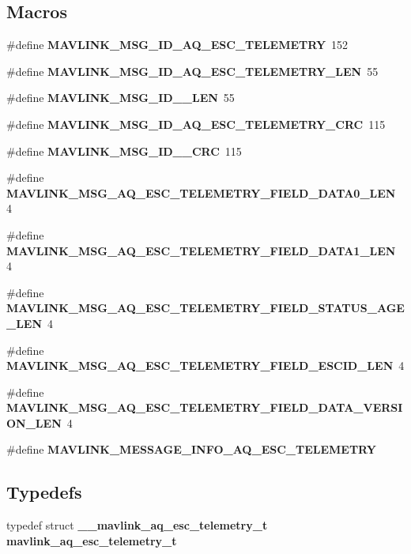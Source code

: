 \subsection*{Macros}
\begin{DoxyCompactItemize}
\item 
\#define \textbf{ M\+A\+V\+L\+I\+N\+K\+\_\+\+M\+S\+G\+\_\+\+I\+D\+\_\+\+A\+Q\+\_\+\+E\+S\+C\+\_\+\+T\+E\+L\+E\+M\+E\+T\+RY}~152
\item 
\#define \textbf{ M\+A\+V\+L\+I\+N\+K\+\_\+\+M\+S\+G\+\_\+\+I\+D\+\_\+\+A\+Q\+\_\+\+E\+S\+C\+\_\+\+T\+E\+L\+E\+M\+E\+T\+R\+Y\+\_\+\+L\+EN}~55
\item 
\#define \textbf{ M\+A\+V\+L\+I\+N\+K\+\_\+\+M\+S\+G\+\_\+\+I\+D\+\_\+\_\+\+L\+EN}~55
\item 
\#define \textbf{ M\+A\+V\+L\+I\+N\+K\+\_\+\+M\+S\+G\+\_\+\+I\+D\+\_\+\+A\+Q\+\_\+\+E\+S\+C\+\_\+\+T\+E\+L\+E\+M\+E\+T\+R\+Y\+\_\+\+C\+RC}~115
\item 
\#define \textbf{ M\+A\+V\+L\+I\+N\+K\+\_\+\+M\+S\+G\+\_\+\+I\+D\+\_\+\_\+\+C\+RC}~115
\item 
\#define \textbf{ M\+A\+V\+L\+I\+N\+K\+\_\+\+M\+S\+G\+\_\+\+A\+Q\+\_\+\+E\+S\+C\+\_\+\+T\+E\+L\+E\+M\+E\+T\+R\+Y\+\_\+\+F\+I\+E\+L\+D\+\_\+\+D\+A\+T\+A0\+\_\+\+L\+EN}~4
\item 
\#define \textbf{ M\+A\+V\+L\+I\+N\+K\+\_\+\+M\+S\+G\+\_\+\+A\+Q\+\_\+\+E\+S\+C\+\_\+\+T\+E\+L\+E\+M\+E\+T\+R\+Y\+\_\+\+F\+I\+E\+L\+D\+\_\+\+D\+A\+T\+A1\+\_\+\+L\+EN}~4
\item 
\#define \textbf{ M\+A\+V\+L\+I\+N\+K\+\_\+\+M\+S\+G\+\_\+\+A\+Q\+\_\+\+E\+S\+C\+\_\+\+T\+E\+L\+E\+M\+E\+T\+R\+Y\+\_\+\+F\+I\+E\+L\+D\+\_\+\+S\+T\+A\+T\+U\+S\+\_\+\+A\+G\+E\+\_\+\+L\+EN}~4
\item 
\#define \textbf{ M\+A\+V\+L\+I\+N\+K\+\_\+\+M\+S\+G\+\_\+\+A\+Q\+\_\+\+E\+S\+C\+\_\+\+T\+E\+L\+E\+M\+E\+T\+R\+Y\+\_\+\+F\+I\+E\+L\+D\+\_\+\+E\+S\+C\+I\+D\+\_\+\+L\+EN}~4
\item 
\#define \textbf{ M\+A\+V\+L\+I\+N\+K\+\_\+\+M\+S\+G\+\_\+\+A\+Q\+\_\+\+E\+S\+C\+\_\+\+T\+E\+L\+E\+M\+E\+T\+R\+Y\+\_\+\+F\+I\+E\+L\+D\+\_\+\+D\+A\+T\+A\+\_\+\+V\+E\+R\+S\+I\+O\+N\+\_\+\+L\+EN}~4
\item 
\#define \textbf{ M\+A\+V\+L\+I\+N\+K\+\_\+\+M\+E\+S\+S\+A\+G\+E\+\_\+\+I\+N\+F\+O\+\_\+\+A\+Q\+\_\+\+E\+S\+C\+\_\+\+T\+E\+L\+E\+M\+E\+T\+RY}
\end{DoxyCompactItemize}
\subsection*{Typedefs}
\begin{DoxyCompactItemize}
\item 
typedef struct \textbf{ \+\_\+\+\_\+mavlink\+\_\+aq\+\_\+esc\+\_\+telemetry\+\_\+t} \textbf{ mavlink\+\_\+aq\+\_\+esc\+\_\+telemetry\+\_\+t}
\end{DoxyCompactItemize}


